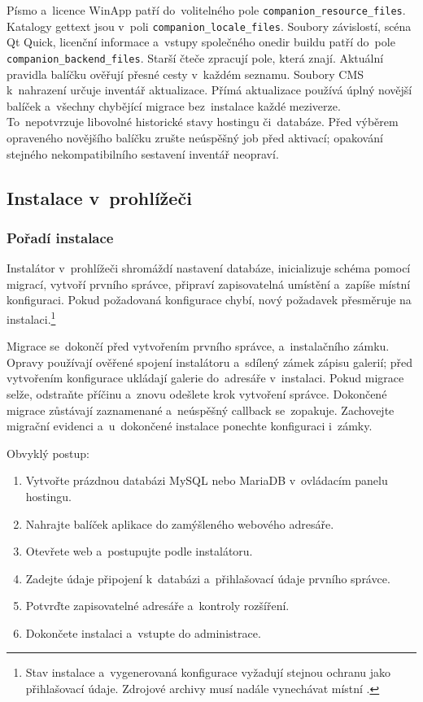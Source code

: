 \documentclass[11pt,a4paper]{article}
\newcommand{\filepath}[1]{\path{#1}}
\newcommand{\codeword}[1]{\nolinkurl{#1}}
\begin{document}
Písmo a~licence WinApp patří do~volitelného pole
\codeword{companion_resource_files}. Katalogy gettext jsou v~poli
\codeword{companion_locale_files}. Soubory závislostí, scéna Qt Quick,
licenční informace a~vstupy společného onedir buildu patří do~pole
\codeword{companion_backend_files}. Starší čteče zpracují pole, která znají.
Aktuální pravidla balíčku ověřují přesné cesty v~každém seznamu. Soubory CMS
k~nahrazení určuje inventář aktualizace. Přímá aktualizace používá úplný
novější balíček a~všechny chybějící
migrace bez~instalace každé meziverze. To~nepotvrzuje libovolné historické stavy
hostingu či~databáze. Před výběrem opraveného novějšího balíčku zrušte neúspěšný
job před aktivací; opakování stejného nekompatibilního sestavení inventář
neopraví.

\subsection{Instalace v~prohlížeči}

\subsubsection{Pořadí instalace}

Instalátor v~prohlížeči shromáždí nastavení databáze, inicializuje schéma pomocí
migrací, vytvoří prvního správce, připraví zapisovatelná umístění a~zapíše
místní konfiguraci. Pokud požadovaná konfigurace chybí, nový požadavek
přesměruje na instalaci.\footnote{Stav instalace a~vygenerovaná konfigurace
vyžadují stejnou ochranu jako přihlašovací údaje. Zdrojové archivy musí nadále
vynechávat místní \filepath{config.php}.}

Migrace se~dokončí před vytvořením prvního správce, \filepath{config.php}
a~instalačního zámku. Opravy používají ověřené spojení instalátoru a~sdílený
zámek zápisu galerií; před vytvořením konfigurace ukládají galerie do~adresáře
\filepath{galleries/} v~instalaci. Pokud migrace selže, odstraňte příčinu
a~znovu odešlete krok vytvoření správce. Dokončené migrace zůstávají zaznamenané
a~neúspěšný callback se~zopakuje. Zachovejte migrační evidenci a~u~dokončené
instalace ponechte konfiguraci i~zámky.

Obvyklý postup:

\begin{enumerate}
  \item Vytvořte prázdnou databázi MySQL nebo MariaDB v~ovládacím panelu
  hostingu.
  \item Nahrajte balíček aplikace do zamýšleného webového adresáře.
  \item Otevřete web a~postupujte podle instalátoru.
  \item Zadejte údaje připojení k~databázi a~přihlašovací údaje prvního správce.
  \item Potvrďte zapisovatelné adresáře a~kontroly rozšíření.
  \item Dokončete instalaci a~vstupte do administrace.
\end{enumerate}
\end{document}
